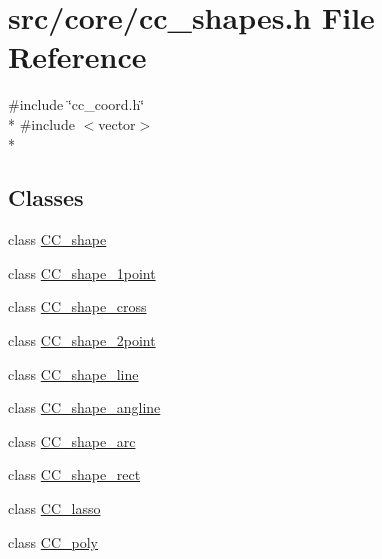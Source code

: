 \hypertarget{a00210}{\section{src/core/cc\-\_\-shapes.h File Reference}
\label{a00210}
}
{\ttfamily \#include \char`\"{}cc\-\_\-coord.\-h\char`\"{}}\\*
{\ttfamily \#include $<$vector$>$}\\*
\subsection*{Classes}
\begin{DoxyCompactItemize}
\item 
class \hyperlink{a00037}{C\-C\-\_\-shape}
\item 
class \hyperlink{a00038}{C\-C\-\_\-shape\-\_\-1point}
\item 
class \hyperlink{a00042}{C\-C\-\_\-shape\-\_\-cross}
\item 
class \hyperlink{a00039}{C\-C\-\_\-shape\-\_\-2point}
\item 
class \hyperlink{a00043}{C\-C\-\_\-shape\-\_\-line}
\item 
class \hyperlink{a00040}{C\-C\-\_\-shape\-\_\-angline}
\item 
class \hyperlink{a00041}{C\-C\-\_\-shape\-\_\-arc}
\item 
class \hyperlink{a00044}{C\-C\-\_\-shape\-\_\-rect}
\item 
class \hyperlink{a00033}{C\-C\-\_\-lasso}
\item 
class \hyperlink{a00036}{C\-C\-\_\-poly}
\end{DoxyCompactItemize}
